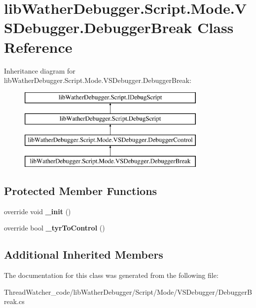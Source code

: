 \hypertarget{classlib_wather_debugger_1_1_script_1_1_mode_1_1_v_s_debugger_1_1_debugger_break}{\section{lib\+Wather\+Debugger.\+Script.\+Mode.\+V\+S\+Debugger.\+Debugger\+Break Class Reference}
\label{classlib_wather_debugger_1_1_script_1_1_mode_1_1_v_s_debugger_1_1_debugger_break}
}
Inheritance diagram for lib\+Wather\+Debugger.\+Script.\+Mode.\+V\+S\+Debugger.\+Debugger\+Break\+:\begin{figure}[H]
\begin{center}
\leavevmode
\includegraphics[height=4.000000cm]{classlib_wather_debugger_1_1_script_1_1_mode_1_1_v_s_debugger_1_1_debugger_break}
\end{center}
\end{figure}
\subsection*{Protected Member Functions}
\begin{DoxyCompactItemize}
\item 
\hypertarget{classlib_wather_debugger_1_1_script_1_1_mode_1_1_v_s_debugger_1_1_debugger_break_ad060298335de23a5b2843a831d6fb55b}{override void {\bfseries \+\_\+init} ()}\label{classlib_wather_debugger_1_1_script_1_1_mode_1_1_v_s_debugger_1_1_debugger_break_ad060298335de23a5b2843a831d6fb55b}

\item 
\hypertarget{classlib_wather_debugger_1_1_script_1_1_mode_1_1_v_s_debugger_1_1_debugger_break_a554c2934d205d3291c12a0ce10b5931d}{override bool {\bfseries \+\_\+tyr\+To\+Control} ()}\label{classlib_wather_debugger_1_1_script_1_1_mode_1_1_v_s_debugger_1_1_debugger_break_a554c2934d205d3291c12a0ce10b5931d}

\end{DoxyCompactItemize}
\subsection*{Additional Inherited Members}


The documentation for this class was generated from the following file\+:\begin{DoxyCompactItemize}
\item 
Thread\+Watcher\+\_\+code/lib\+Wather\+Debugger/\+Script/\+Mode/\+V\+S\+Debugger/Debugger\+Break.\+cs\end{DoxyCompactItemize}
